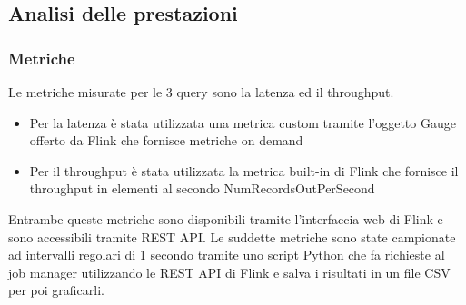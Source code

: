 \documentclass[conference]{IEEEtran}
\begin{document}
\subsection{Analisi delle prestazioni}
\subsubsection{Metriche}
Le metriche misurate per le 3 query sono la latenza ed il throughput. 
\begin{itemize}
    \item Per la latenza è stata utilizzata una metrica custom tramite l'oggetto Gauge offerto da Flink che fornisce metriche on demand
    \item Per il throughput è stata utilizzata la metrica built-in di Flink che fornisce il throughput in elementi al secondo NumRecordsOutPerSecond
\end{itemize}
Entrambe queste metriche sono disponibili tramite l'interfaccia web di Flink e sono accessibili tramite REST API. Le suddette metriche sono state campionate ad intervalli regolari di 1 secondo tramite uno script Python che fa richieste al job manager utilizzando le REST API di Flink e salva i risultati in un file CSV per poi graficarli.
\end{document}
